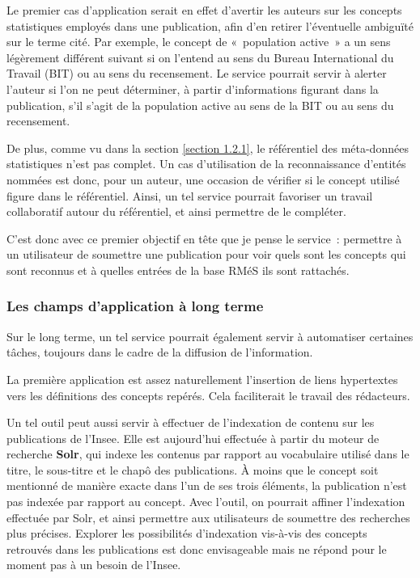 Le premier cas d'application serait en effet d'avertir les auteurs sur les concepts statistiques employés dans une publication, afin d'en retirer l'éventuelle ambiguïté sur le terme cité. Par exemple, le concept de «~population active~» a un sens légèrement différent suivant si on l'entend au sens du Bureau International du Travail (BIT) ou au sens du recensement. Le service pourrait servir à alerter l'auteur si l'on ne peut déterminer, à partir d'informations figurant dans la publication, s'il s'agit de la population active au sens de la BIT ou au sens du recensement.
\newline

De plus, comme vu dans la section \ref{section 1.2.1}, le référentiel des méta-données statistiques n'est pas complet. Un cas d'utilisation de la reconnaissance d'entités nommées est donc, pour un auteur, une occasion de vérifier si le concept utilisé figure dans le référentiel. Ainsi, un tel service pourrait favoriser un travail collaboratif autour du référentiel, et ainsi permettre de le compléter.
\newline

C'est donc avec ce premier objectif en tête que je pense le service~: permettre à un utilisateur de soumettre une publication pour voir quels sont les concepts qui sont reconnus et à quelles entrées de la base RMéS ils sont rattachés.
\label{section 2.1.3}

\subsubsection{Les champs d'application à long terme}
Sur le long terme, un tel service pourrait également servir à automatiser certaines tâches, toujours dans le cadre de la diffusion de l'information.
\newline

La première application est assez naturellement l'insertion de liens hypertextes vers les définitions des concepts repérés. Cela faciliterait le travail des rédacteurs. 
\newline

Un tel outil peut aussi servir à effectuer de l'indexation de contenu sur les publications de l'Insee. Elle est aujourd'hui effectuée à partir du moteur de recherche \textbf{Solr}, qui indexe les contenus par rapport au vocabulaire utilisé dans le titre, le sous-titre et le chapô des publications. À moins que le concept soit mentionné de manière exacte dans l'un de ses trois éléments, la publication n'est pas indexée par rapport au concept. Avec l'outil, on pourrait affiner l'indexation effectuée par Solr, et ainsi permettre aux utilisateurs de soumettre des recherches plus précises. Explorer les possibilités d'indexation vis-à-vis des concepts retrouvés dans les publications est donc envisageable mais ne répond pour le moment pas à un besoin de l'Insee.
\newline

